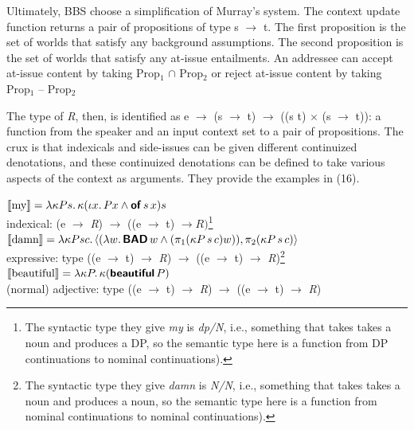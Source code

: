 \documentclass[12pt]{article}
\newcommand{\lam}{\lambda}
\newcommand{\dt}{{.}\mkern\thinmuskip}
\newcommand{\func}[1]{\textbf{\textsf{#1}}}
\begin{document}
Ultimately, BBS choose a simplification of Murray's system. The context update function returns a pair of propositions of type \textsf{s} $\rightarrow$ \textsf{t}. The first proposition is the set of worlds that  satisfy any background assumptions. The second proposition is the set of worlds that satisfy any at-issue entailments. An addressee can accept at-issue content by taking Prop$_1$ $\cap$ Prop$_2$ or reject at-issue content by taking Prop$_1$ -- Prop$_2$
    
The type of \textit{R}, then, is identified as \textsf{e $\rightarrow$ (s $\rightarrow$ t) $\rightarrow$ ((s \rightarrow t) $\times$ (s $\rightarrow$ t))}: a function from the speaker and an input context set to a pair of propositions. The crux is that indexicals and side-issues can be given different continuized denotations, and these continuized denotations can be defined to take various aspects of the context as arguments. They provide the examples in (16).

\pex 
\a $\llbracket \textrm{my} \rrbracket = \lam \kappa Ps\dt \kappa(\iota x\dt Px \land \func{of}\, s\, x)s$ \\ indexical: (\textsf{e} $\rightarrow$ \textit{R}) $\rightarrow$ ((\textsf{e} $\rightarrow$ \textrm{t}) $\rightarrow \textit{R})$\footnote{The syntactic type they give \textit{my} is \textit{dp/N}, i.e., something that takes takes a noun and produces a DP, so the semantic type here is a function from DP continuations to nominal continuations).}
\a $\llbracket \textrm{damn} \rrbracket = \lam \kappa P s c \dt \langle(\lam w \dt \func{BAD} \, w \land (\pi_1 (\kappa P \, s \, c) w)), \pi_2(\kappa P \, s \, c)\rangle$ \\ expressive: type ((\textsf{e} $\rightarrow$ \textsf{t}) $\rightarrow$ \textit{R}) $\rightarrow$ ((\textsf{e} $\rightarrow$ \textsf{t}) $\rightarrow$ \textit{R})\footnote{The syntactic type they give \textit{damn} is \textit{N/N}, i.e., something that takes takes a noun and produces a noun, so the semantic type here is a function from nominal continuations to nominal continuations).}
\a $\llbracket \textrm{beautiful} \rrbracket = \lam \kappa P \dt \kappa (\func{beautiful}\, P)$ \\ (normal) adjective: type ((\textsf{e} $\rightarrow$ \textsf{t}) $\rightarrow$ \textit{R}) $\rightarrow$ ((\textsf{e} $\rightarrow$ \textsf{t}) $\rightarrow$ \textit{R})
\xe
  
\end{document}
